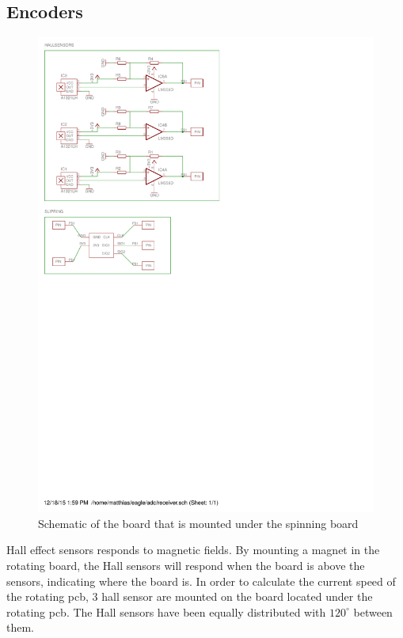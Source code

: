\subsection{Encoders} \label{sec:encoders}
\begin{figure}
 \caption{Schematic of the board that is mounted under the spinning board}
 \label{fig:botm_schematic}
 \centering
 \includegraphics[scale = 0.5,trim = 0 14.5cm 8cm 0,clip = true]{img/bottompcb_schematic}
\end{figure}

Hall effect sensors responds to magnetic fields.
By mounting a magnet in the rotating board, the Hall sensors will respond when the board is above the sensors, indicating where the board is.
In order to calculate the current speed of the rotating pcb, 3 hall sensor are mounted on the board located under the rotating pcb.
The Hall sensors have been equally distributed with $120^{\circ}$ between them.

